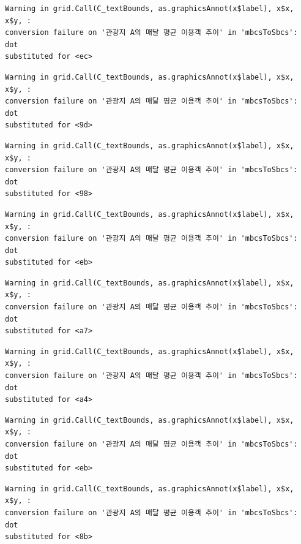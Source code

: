 \documentclass[
  letterpaper,
  DIV=11,
  numbers=noendperiod]{scrreprt}
\begin{document}
\begin{verbatim}
Warning in grid.Call(C_textBounds, as.graphicsAnnot(x$label), x$x, x$y, :
conversion failure on '관광지 A의 매달 평균 이용객 추이' in 'mbcsToSbcs': dot
substituted for <ec>
\end{verbatim}

\begin{verbatim}
Warning in grid.Call(C_textBounds, as.graphicsAnnot(x$label), x$x, x$y, :
conversion failure on '관광지 A의 매달 평균 이용객 추이' in 'mbcsToSbcs': dot
substituted for <9d>
\end{verbatim}

\begin{verbatim}
Warning in grid.Call(C_textBounds, as.graphicsAnnot(x$label), x$x, x$y, :
conversion failure on '관광지 A의 매달 평균 이용객 추이' in 'mbcsToSbcs': dot
substituted for <98>
\end{verbatim}

\begin{verbatim}
Warning in grid.Call(C_textBounds, as.graphicsAnnot(x$label), x$x, x$y, :
conversion failure on '관광지 A의 매달 평균 이용객 추이' in 'mbcsToSbcs': dot
substituted for <eb>
\end{verbatim}

\begin{verbatim}
Warning in grid.Call(C_textBounds, as.graphicsAnnot(x$label), x$x, x$y, :
conversion failure on '관광지 A의 매달 평균 이용객 추이' in 'mbcsToSbcs': dot
substituted for <a7>
\end{verbatim}

\begin{verbatim}
Warning in grid.Call(C_textBounds, as.graphicsAnnot(x$label), x$x, x$y, :
conversion failure on '관광지 A의 매달 평균 이용객 추이' in 'mbcsToSbcs': dot
substituted for <a4>
\end{verbatim}

\begin{verbatim}
Warning in grid.Call(C_textBounds, as.graphicsAnnot(x$label), x$x, x$y, :
conversion failure on '관광지 A의 매달 평균 이용객 추이' in 'mbcsToSbcs': dot
substituted for <eb>
\end{verbatim}

\begin{verbatim}
Warning in grid.Call(C_textBounds, as.graphicsAnnot(x$label), x$x, x$y, :
conversion failure on '관광지 A의 매달 평균 이용객 추이' in 'mbcsToSbcs': dot
substituted for <8b>
\end{verbatim}
\end{document}
